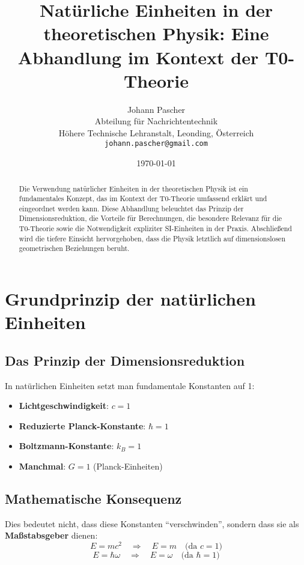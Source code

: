 \documentclass[12pt,a4paper]{article}
\title{Natürliche Einheiten in der theoretischen Physik: Eine Abhandlung im Kontext der T0-Theorie}
\author{Johann Pascher\\
	Abteilung für Nachrichtentechnik\\
	Höhere Technische Lehranstalt, Leonding, Österreich\\
	\texttt{johann.pascher@gmail.com}}
\date{\today}
\begin{document}
	
	\maketitle
	
	\begin{abstract}
		Die Verwendung natürlicher Einheiten in der theoretischen Physik ist ein fundamentales Konzept, das im Kontext der T0-Theorie umfassend erklärt und eingeordnet werden kann. Diese Abhandlung beleuchtet das Prinzip der Dimensionsreduktion, die Vorteile für Berechnungen, die besondere Relevanz für die T0-Theorie sowie die Notwendigkeit expliziter SI-Einheiten in der Praxis. Abschließend wird die tiefere Einsicht hervorgehoben, dass die Physik letztlich auf dimensionslosen geometrischen Beziehungen beruht.
	\end{abstract}
	
	\tableofcontents
	
	\section{Grundprinzip der natürlichen Einheiten}
	\label{sec:grundprinzip}
	
	\subsection{Das Prinzip der Dimensionsreduktion}
	In natürlichen Einheiten setzt man fundamentale Konstanten auf 1:
	\begin{itemize}
		\item \textbf{Lichtgeschwindigkeit}: $c = 1$
		\item \textbf{Reduzierte Planck-Konstante}: $\hbar = 1$
		\item \textbf{Boltzmann-Konstante}: $k_B = 1$
		\item \textbf{Manchmal}: $G = 1$ (Planck-Einheiten)
	\end{itemize}
	
	\subsection{Mathematische Konsequenz}
	Dies bedeutet nicht, dass diese Konstanten ``verschwinden'', sondern dass sie als \textbf{Maßstabsgeber} dienen:
	\begin{equation}
		E = m c^2 \quad \Rightarrow \quad E = m \quad \text{(da $c=1$)}
	\end{equation}
	\begin{equation}
		E = \hbar \omega \quad \Rightarrow \quad E = \omega \quad \text{(da $\hbar=1$)}
	\end{equation}
	
\end{document}
